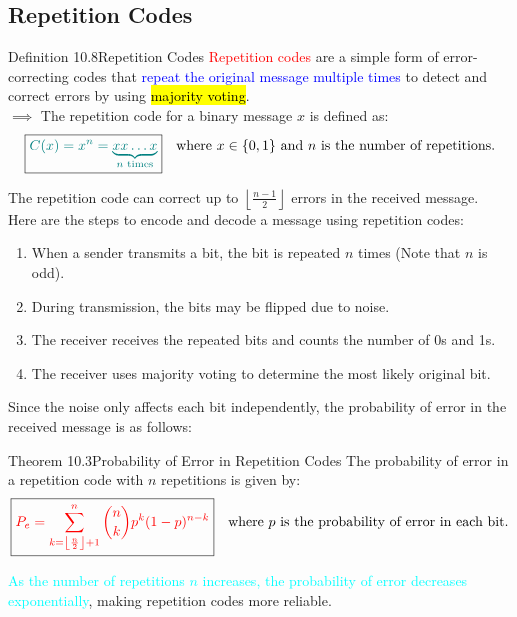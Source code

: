 \documentclass{book}
\begin{document}
\subsection{Repetition Codes}
\begin{defBox}{Definition 10.8}{Repetition Codes}
    \textcolor{red}{Repetition codes} are a simple form of error-correcting codes that \textcolor{blue}{repeat the original message multiple times} to detect and correct errors by using \hl{majority voting}.\\
    $\implies$ The repetition code for a binary message $x$ is defined as:
    \[
        \boxed{\textcolor{teal}{C(x) = x^n = \underbrace{xx\ldots x}_{n \text{ times}}}} \quad \text{where } x \in \{0, 1\} \text{ and } n \text{ is the number of repetitions.}
    \]
\end{defBox}
The repetition code can correct up to $\left\lfloor \frac{n-1}{2} \right\rfloor$ errors in the received message.\\
\vspace{2mm}
Here are the steps to encode and decode a message using repetition codes:
\begin{enumerate}
    \item When a sender transmits a bit, the bit is repeated $n$ times (Note that $n$ is odd).
    \item During transmission, the bits may be flipped due to noise.
    \item The receiver receives the repeated bits and counts the number of 0s and 1s.
    \item The receiver uses majority voting to determine the most likely original bit.
\end{enumerate}
Since the noise only affects each bit independently, the probability of error in the received message is as follows:
\begin{thmBox}{Theorem 10.3}{Probability of Error in Repetition Codes}
    The probability of error in a repetition code with $n$ repetitions is given by:
    \[
        \boxed{\textcolor{red}{P_e = \sum_{k=\left\lfloor \frac{n}{2} \right\rfloor + 1}^{n} \binom{n}{k} p^k (1-p)^{n-k}}} \quad \text{where } p \text{ is the probability of error in each bit.}
    \]
\end{thmBox}
\textcolor{cyan}{As the number of repetitions $n$ increases, the probability of error decreases exponentially}, making repetition codes more reliable.
\end{document}
